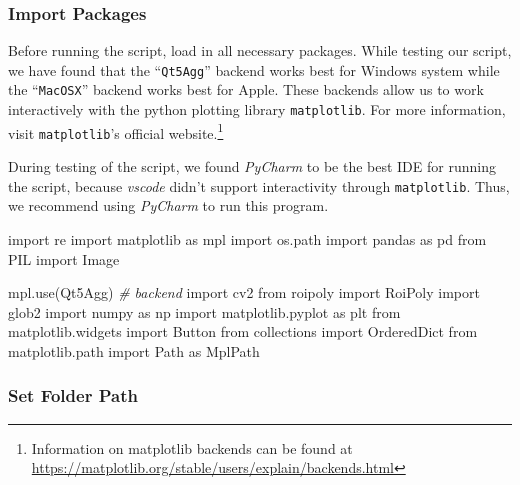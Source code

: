 \documentclass[
]{article}
\newenvironment{Shaded}{\begin{snugshade}}{\end{snugshade}}
\newcommand{\CommentTok}[1]{\textcolor[rgb]{0.56,0.35,0.01}{\textit{#1}}}
\newcommand{\ImportTok}[1]{#1}
\newcommand{\NormalTok}[1]{#1}
\newcommand{\StringTok}[1]{\textcolor[rgb]{0.31,0.60,0.02}{#1}}
\begin{document}
\hypertarget{import-packages}{%
\subsubsection{Import Packages}\label{import-packages}}

Before running the script, load in all necessary packages. While testing our script, we have found that the ``\texttt{Qt5Agg}'' backend works best for Windows system while the ``\texttt{MacOSX}'' backend works best for Apple. These backends allow us to work interactively with the python plotting library \texttt{matplotlib}. For more information, visit \texttt{matplotlib}'s official website.\footnote{Information on matplotlib backends can be found at \url{https://matplotlib.org/stable/users/explain/backends.html}}

During testing of the script, we found \emph{PyCharm} to be the best IDE for running the script, because \emph{vscode} didn't support interactivity through \texttt{matplotlib}. Thus, we recommend using \emph{PyCharm} to run this program.

\begin{Shaded}
\begin{Highlighting}[]
\ImportTok{import}\NormalTok{ re}
\ImportTok{import}\NormalTok{ matplotlib }\ImportTok{as}\NormalTok{ mpl}
\ImportTok{import}\NormalTok{ os.path}
\ImportTok{import}\NormalTok{ pandas }\ImportTok{as}\NormalTok{ pd}
\ImportTok{from}\NormalTok{ PIL }\ImportTok{import}\NormalTok{ Image}

\NormalTok{mpl.use(}\StringTok{\textquotesingle{}Qt5Agg\textquotesingle{}}\NormalTok{)  }\CommentTok{\# backend}
\ImportTok{import}\NormalTok{ cv2}
\ImportTok{from}\NormalTok{ roipoly }\ImportTok{import}\NormalTok{ RoiPoly}
\ImportTok{import}\NormalTok{ glob2}
\ImportTok{import}\NormalTok{ numpy }\ImportTok{as}\NormalTok{ np}
\ImportTok{import}\NormalTok{ matplotlib.pyplot }\ImportTok{as}\NormalTok{ plt}
\ImportTok{from}\NormalTok{ matplotlib.widgets }\ImportTok{import}\NormalTok{ Button}
\ImportTok{from}\NormalTok{ collections }\ImportTok{import}\NormalTok{ OrderedDict}
\ImportTok{from}\NormalTok{ matplotlib.path }\ImportTok{import}\NormalTok{ Path }\ImportTok{as}\NormalTok{ MplPath}
\end{Highlighting}
\end{Shaded}

\hypertarget{set-folder-path}{%
\subsubsection{Set Folder Path}\label{set-folder-path}}
\end{document}
